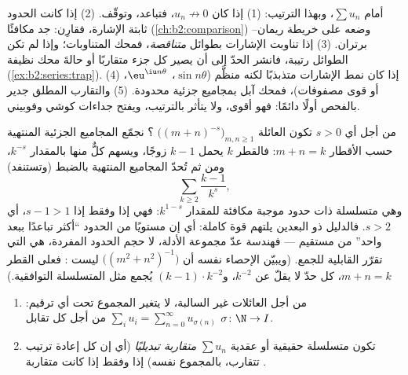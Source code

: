 \begin{method}\label{met:b2:series:choosing}
أمام $\sum u_n$، وبهذا الترتيب: (1) إذا كان $u_n \not\to 0$، فتباعد،
وتوقّف. (2) إذا كانت الحدود ثابتة الإشارة، فقارِن: جد
مكافئًا (\cref{ch:b2:comparison}) وضعه على
خريطة ريمان--برتران. (3) إذا تناوبت الإشارات بطوائل
\emph{متناقصة}، فمحك المتناوبات؛ وإذا لم تكن الطوائل
رتيبة، فانشر الحدّ إلى أن يصير كل جزء متقاربًا 
أو حالةَ محك نظيفة (\cref{ex:b2:series:trap}). (4)
إذا كان نمط الإشارات متذبذبًا لكنه منظَّم ($\sin
n\theta$، $\eu^{\iu n\theta}$، أو قوى مصفوفات)، فمحك آبل بمجاميع
جزئية محدودة. (5) والتقارب المطلق جدير بالفحص أولًا
دائمًا: فهو أقوى، ولا يتأثر بالترتيب، ويفتح جداءات كوشي
وفوبيني.
\end{method}

\begin{example}\label{ex:b2:series:diagonalcount}
من أجل أي $s > 0$ تكون العائلة
$\bigl((m + n)^{-s}\bigr)_{m, n \geq 1}$ ؟ نجمّع
المجاميع الجزئية المنتهية حسب الأقطار $m + n = k$: فالقطر $k$
يحمل $k - 1$ زوجًا، ويسهم كلٌّ منها بالمقدار $k^{-s}$، ومن ثم تُحدّ
المجاميع المنتهية بالضبط (وتستنفد)
\[
\sum_{k \geq 2} \frac{k - 1}{k^{s}} ,
\]
وهي متسلسلة ذات حدود موجبة مكافئة للمقدار $k^{1-s}$: فهي 
إذا وفقط إذا $s - 1 > 1$، أي $s > 2$. فالدليل ذو البعدين يلتهم
قوة كاملة: أي إن مستويًا من الحدود ``أكثر تباعدًا ببعد
واحد'' من مستقيم --- فهندسة عدّ مجموعة الأدلة، لا حجم
الحدود المفردة، هي التي تقرّر القابلية للجمع.
(ويبيّن الإحصاء نفسه أن $\bigl((m^2 + n^2)^{-1}\bigr)$ ليست
: فعلى القطر $m + n = k$، كل حدّ لا يقلّ عن
$k^{-2}$، و$(k-1)\cdot k^{-2}$ يُجمع مثل المتسلسلة
التوافقية.)
\end{example}

\begin{theorem}\label{thm:b2:series:rearrangement}
\begin{enumerate}
  \item من أجل العائلات غير السالبة، لا يتغير المجموع تحت أي
        ترقيم: $\sum_{i} u_i = \sum_{n=0}^{\infty}
        u_{\sigma(n)}$ من أجل كل تقابل $\sigma \colon \N \to I$.
  \item تكون متسلسلة حقيقية أو عقدية $\sum u_n$ \emph{متقاربة
        تبديليًا} (أي إن كل إعادة ترتيب تتقارب، بالمجموع نفسه)
        إذا وفقط إذا كانت متقاربة .
\end{enumerate}
\end{theorem}


